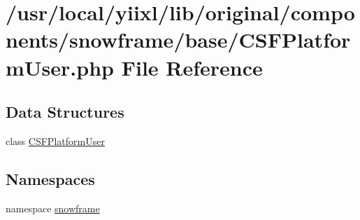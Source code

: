 \hypertarget{CSFPlatformUser_8php}{
\section{/usr/local/yiixl/lib/original/components/snowframe/base/CSFPlatformUser.php File Reference}
\label{CSFPlatformUser_8php}
}
\subsection*{Data Structures}
\begin{DoxyCompactItemize}
\item 
class \hyperlink{classCSFPlatformUser}{CSFPlatformUser}
\end{DoxyCompactItemize}
\subsection*{Namespaces}
\begin{DoxyCompactItemize}
\item 
namespace \hyperlink{namespacesnowframe}{snowframe}
\end{DoxyCompactItemize}
